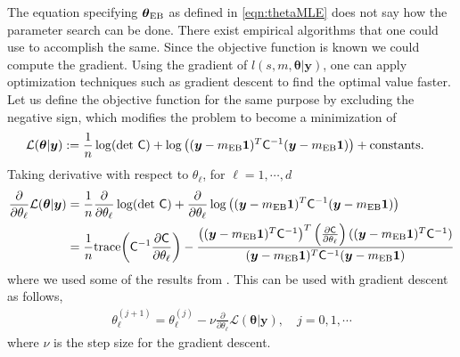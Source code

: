 \documentclass{iitthesis}          %
\newcommand{\bm}[1]{\boldsymbol{#1}}
\newcommand{\trace}[1]{\textup{trace}{#1}}
\newcommand{\vtheta}{{\bm{\theta}}}
\newcommand{\vy}{\bm{y}}
\newcommand{\vone}{\bm{1}}
\newcommand{\mC}{\mathsf{C}}
\newcommand{\mCInv}{{\mathsf{C}^{-1}}}
\newcommand{\MLE}{\textup{EB}}
\begin{document}
 \label{grad_descent_MLE}
The equation specifying $\vtheta_\MLE$ as defined in \eqref{eqn:thetaMLE} does not say how the parameter search can be done. There exist empirical algorithms \cite{Bre73, For77} that one could use to accomplish the same.
Since the objective function is known we could compute the gradient.
Using the gradient of $l(s,m,\vtheta | \vy)$, one can apply optimization techniques such as gradient descent to find the optimal value faster. Let us define the objective function for the same purpose by excluding the negative sign, which modifies the problem to become a minimization of
\begin{align*}
\mathcal{L}(\vtheta | \vy)
&:= \frac{1}{n} \log(\det\, \mC) +  \log\left( (\vy-m_\MLE\vone)^T\mCInv(\vy-m_\MLE\vone) \right) + \text{constants.}
\end{align*}
Taking derivative with respect to $\theta_\ell$, for $\ell=1,\cdots,d$
\begin{align*}
\frac{\partial}{\partial \theta_\ell} \mathcal{L}(\vtheta | \vy)
&=  \frac{1}{n} \frac{\partial}{\partial \theta_\ell} \log(\det\, \mC) + \frac{\partial}{\partial \theta_\ell} 
\log\left((\vy-m_\MLE\vone)^T\mCInv(\vy-m_\MLE\vone) \right)
\\
&= \frac 1n \trace{\left( \mCInv \frac{\partial \mC}{\partial \theta_\ell} \right)}
- 
\frac
{\left((\vy-m_\MLE\vone)^T\mCInv\right)^T 
	\left( \frac{\partial \mC}{\partial \theta_\ell} \right)
	((\vy-m_\MLE\vone)^T\mCInv)}
{(\vy-m_\MLE\vone)^T\mCInv(\vy-m_\MLE\vone)}
\end{align*}
where we used some of the results from \cite{Dong2017a}. 
This can be used with gradient descent as follows,
\begin{align}
\label{eqn:deep_descent}
\theta_\ell^{(j+1)} = \theta_\ell^{(j)} - \nu \frac{\partial}{\partial \theta_\ell} \mathcal{L}(\vtheta | \vy), \quad j=0,1,\cdots
\end{align}
where $\nu$ is the step size for the gradient descent. 




\end{document}

